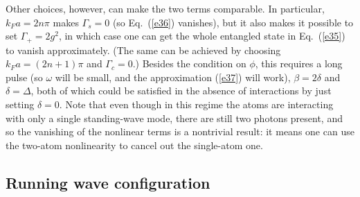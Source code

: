 \documentclass[aps,pra,twocolumn,floatfix,superscriptaddress]{revtex4}
\begin{document}
Other choices, however, can make the two terms comparable. In particular, $k_Fa= 2n\pi$ makes $\Gamma_s=0$ (so Eq.~(\ref{e36}) vanishes), but it also makes it possible to set $\Gamma_+ = 2 g^2$, in which case one can get the whole entangled state in Eq.~(\ref{e35}) to vanish approximately.  (The same can be achieved by choosing $k_Fa= (2n+1) \pi$ and $\Gamma_c=0$.) Besides the condition on $\phi$, this requires a long pulse (so $\omega$ will be small, and the approximation (\ref{e37}) will work), $ \beta=2\delta $ and $\delta=\Delta$, both of which could be satisfied in the absence of interactions by just setting $\delta=0$.  Note that even though in this regime the atoms are interacting with only a single standing-wave mode, there are still two photons present, and so the vanishing of the nonlinear terms is a nontrivial result:  it means one can use the two-atom nonlinearity to cancel out the single-atom one.  

\subsection{Running wave configuration}
\end{document}

